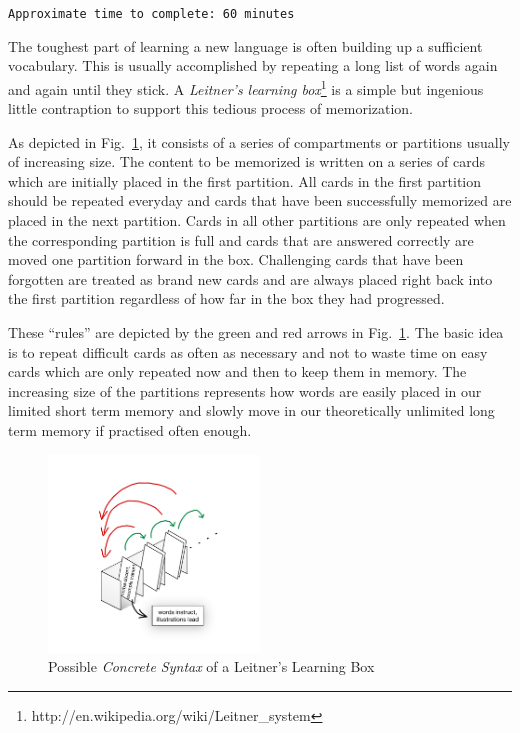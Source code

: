 \genHeader

{\scriptsize \texttt{Approximate time to complete: 60 minutes} }

The toughest part of learning a new language  is often building up a sufficient vocabulary. This is usually accomplished by repeating a long list of words again
and again until they stick. A \emph{Leitner's learning box}\footnote{http://en.wikipedia.org/wiki/Leitner\_system} is a simple but ingenious little contraption
to support this tedious process of memorization.

As depicted in Fig.~\ref{fig:membox_illustration}, it consists of a series of compartments or partitions usually of increasing size. The content to be memorized
is written on a series of cards  which are initially placed in the first partition. All cards in the first  partition should be repeated everyday and cards that
have been successfully memorized are placed in the next partition. Cards in all other partitions are only repeated when the corresponding partition is full and
cards that are  answered correctly are moved one partition forward in the box. Challenging  cards that have been forgotten are treated as brand new cards and
are always  placed right back into the first partition regardless of how far in the box they  had progressed.

These ``rules'' are depicted by the green and red arrows in Fig.~\ref{fig:membox_illustration}. The basic idea is to repeat difficult cards as often as
necessary and not to waste time on easy cards which are only repeated now and then to keep them in memory. The increasing size of the partitions represents how
words are easily placed in our limited short term memory and slowly move in our theoretically unlimited long term memory if practised often enough.

 \begin{figure}[htp]
 \begin{center}
   \includegraphics[width=0.5\textwidth]{../membox_illustration}
   \caption[]{Possible \emph{Concrete Syntax} of a Leitner's Learning Box}
   \label{fig:membox_illustration}
 \end{center}
 \end{figure}
 \FloatBarrier

